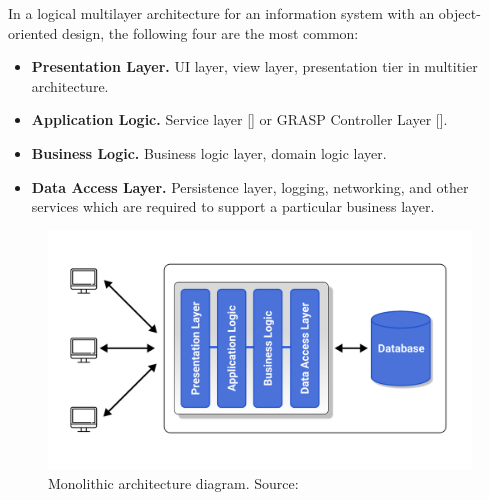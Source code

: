 In a logical multilayer architecture for an information system with an object-oriented design, the following four are the most common:

\begin{itemize} %
    \item \textbf{Presentation Layer.} UI layer, view layer, presentation tier in multitier architecture.
    \item \textbf{Application Logic.} Service layer [\cite{ji2009intelligent, swetina2014toward}]
    or GRASP Controller Layer [\cite{okada2006vision}].
    \item \textbf{Business Logic.} Business logic layer, domain logic layer.
    \item \textbf{Data Access Layer.} Persistence layer, logging, networking, and other services which are required
    to support a particular business layer.
\end{itemize}

\begin{figure}[H]
    \centering
    \includegraphics[width=1\textwidth]{Pictures/Monolith_architecture.pdf}
    \caption{Monolithic architecture diagram. Source: }\label{fig:figure2}
\end{figure}

